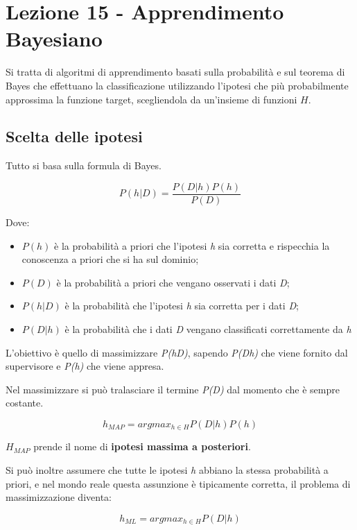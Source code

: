 \section{Lezione 15 - Apprendimento Bayesiano}\label{lezione-15---apprendimento-bayesiano}

Si tratta di algoritmi di apprendimento basati sulla probabilità e sul
teorema di Bayes che effettuano la classificazione utilizzando l'ipotesi che
più probabilmente approssima la funzione target, scegliendola da un'insieme di funzioni $H$.

\subsection{Scelta delle ipotesi}\label{scelta-delle-ipotesi}

Tutto si basa sulla formula di Bayes.

$$
P(h | D) = \frac{P(D|h)P(h)}{P(D)}
$$

Dove:

\begin{itemize}
\item $P(h)$ è la probabilità a priori che l'ipotesi \textit{h} sia corretta e rispecchia la conoscenza a priori che si ha sul dominio;
\item $P(D)$ è la probabilità a priori che vengano osservati i dati \textit{D};
\item $P(h|D)$ è la probabilità che l'ipotesi \textit{h} sia corretta per i dati \textit{D};
\item $P(D|h)$ è la probabilità che i dati \textit{D} vengano classificati correttamente da \textit{h} \end{itemize}

L'obiettivo è quello di massimizzare \emph{P(h\textbar{}D)}, sapendo
\emph{P(D\textbar{}h)} che viene fornito dal supervisore e \emph{P(h)}
che viene appresa.

Nel massimizzare si può tralasciare il termine \emph{P(D)} dal momento
che è sempre costante.

$$
h_{MAP} = argmax_{h \in H} P(D|h)P(h)
$$

$H_{MAP}$ prende il nome di \textbf{ipotesi massima a posteriori}.

Si può inoltre assumere che tutte le ipotesi \emph{h} abbiano la stessa probabilità a priori, e nel mondo reale questa assunzione è tipicamente corretta, il
problema di massimizzazione diventa:

$$
h_{ML} = argmax_{h \in H} P(D|h)
$$

